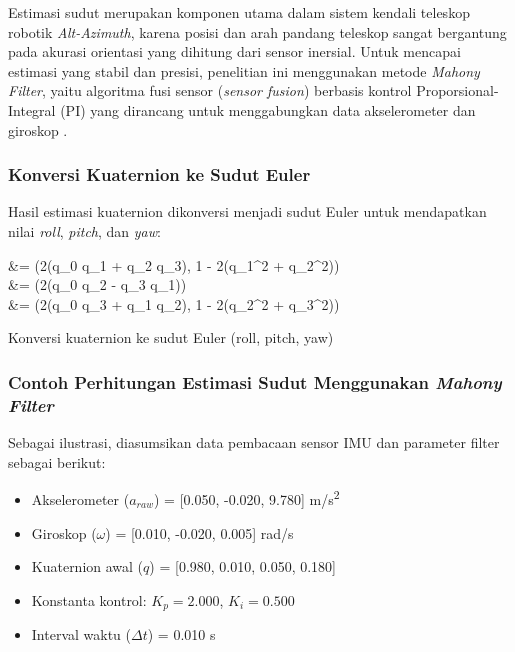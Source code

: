 Estimasi sudut merupakan komponen utama dalam sistem kendali teleskop robotik \textit{Alt-Azimuth}, karena posisi dan arah pandang teleskop sangat bergantung pada akurasi orientasi yang dihitung dari sensor inersial. Untuk mencapai estimasi yang stabil dan presisi, penelitian ini menggunakan metode \textit{Mahony Filter}, yaitu algoritma fusi sensor (\textit{sensor fusion}) berbasis kontrol Proporsional-Integral (PI) yang dirancang untuk menggabungkan data akselerometer dan giroskop \cite{MinhLongHoang2022}.  


\subsubsection{Konversi Kuaternion ke Sudut Euler}
Hasil estimasi kuaternion dikonversi menjadi sudut Euler untuk mendapatkan nilai \textit{roll}, \textit{pitch}, dan \textit{yaw}:

\begin{equationcaptioned}[eq:3.eulerDariQuat]{
		\begin{split}
			 &= (2(q_0 q_1 + q_2 q_3), 1 - 2(q_1^2 + q_2^2))\\
			 &= \arcsin(2(q_0 q_2 - q_3 q_1))\\
			 &= (2(q_0 q_3 + q_1 q_2), 1 - 2(q_2^2 + q_3^2))
		\end{split}
	}{
		Konversi kuaternion ke sudut Euler (roll, pitch, yaw)
	}
\end{equationcaptioned}


\subsubsection{Contoh Perhitungan Estimasi Sudut Menggunakan \textit{Mahony Filter}} \label{III.MahonyContoh}

Sebagai ilustrasi, diasumsikan data pembacaan sensor IMU dan parameter filter sebagai berikut:

\begin{itemize}[noitemsep]
	\item Akselerometer ($a_{raw}$) = [0.050, -0.020, 9.780] m/s\textsuperscript{2}
	\item Giroskop ($\omega$) = [0.010, -0.020, 0.005] rad/s
	\item Kuaternion awal ($q$) = [0.980, 0.010, 0.050, 0.180]
	\item Konstanta kontrol: $K_p = 2.000$, $K_i = 0.500$
	\item Interval waktu ($\Delta t$) = 0.010 s
\end{itemize}

